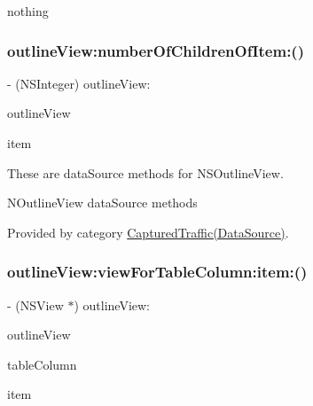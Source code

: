 nothing \mbox{\label{interface_captured_traffic_a0acba96e0a2c8ffacfbb79fa7da8966b}} 
\subsubsection{\texorpdfstring{outline\+View\+:number\+Of\+Children\+Of\+Item\+:()}{outlineView:numberOfChildrenOfItem:()}}
{\footnotesize\ttfamily -\/ (N\+S\+Integer) outline\+View\+: \begin{DoxyParamCaption}\item[{(N\+S\+Outline\+View $\ast$)}]{outline\+View }\item[{numberOfChildrenOfItem:(id)}]{item }\end{DoxyParamCaption}}



These are data\+Source methods for N\+S\+Outline\+View. 

N\+Outline\+View data\+Source methods 

Provided by category \hyperlink{category_captured_traffic_07_data_source_08_a0acba96e0a2c8ffacfbb79fa7da8966b}{Captured\+Traffic(\+Data\+Source)}.

\mbox{\label{interface_captured_traffic_a819263857354e5b56f58dbe5995aaf8c}} 
\subsubsection{\texorpdfstring{outline\+View\+:view\+For\+Table\+Column\+:item\+:()}{outlineView:viewForTableColumn:item:()}}
{\footnotesize\ttfamily -\/ (N\+S\+View $\ast$) outline\+View\+: \begin{DoxyParamCaption}\item[{(N\+S\+Outline\+View $\ast$)}]{outline\+View }\item[{viewForTableColumn:(N\+S\+Table\+Column $\ast$)}]{table\+Column }\item[{item:(id)}]{item }\end{DoxyParamCaption}}

